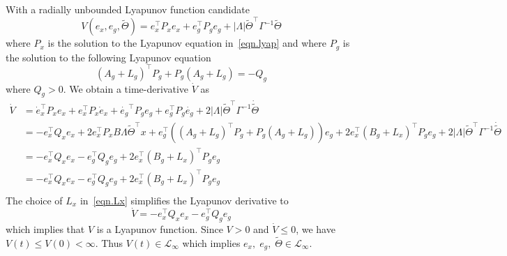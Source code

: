\documentclass[]{../sty/aiaa-tc}
\theoremstyle{examplestyle}
\begin{document}
  \begin{proof-dan}
    With a radially unbounded Lyapunov function candidate
    \begin{equation}
      \label{eqn.lyapfunction_2}
      V(e_{x},e_{g},\widetilde{\Theta}) = e_{x}^{\top}P_{x}e_{x}
      + e_{g}^{\top}P_{g}e_{g}
      + |\Lambda|\widetilde{\Theta}^{\top}\Gamma^{-1}\widetilde{\Theta}
    \end{equation}
    where $P_{x}$ is the solution to the Lyapunov equation in\ \eqref{eqn.lyap} and where $P_{g}$ is the solution to the following Lyapunov equation
    \begin{equation}
      \label{eqn.lyapg}
      (A_{g}+L_{g})^{\top}P_{g}+P_{g}(A_{g}+L_{g}) = -Q_{g}
    \end{equation}
    where $Q_{g}>0$.
    We obtain a time-derivative $\dot{V}$ as
    \begin{equation*}
      \begin{split}
        \dot{V}
        &= \dot{e}_{x}^{\top}P_{x}e_{x}
        + e_{x}^{\top}P_{x}\dot{e}_{x}
        + \dot{e_{g}}^{\top}P_{g}e_{g}
        + e_{g}^{\top}P_{g}\dot{e_{g}}
        + 2|\Lambda|\widetilde{\Theta}^{\top}\Gamma^{-1}\dot{\widetilde{\Theta}} \\
        &= -e_{x}^{\top}Q_{x}e_{x}
        + 2e_{x}^{\top}P_{x}B\Lambda\widetilde{\Theta}^{\top}x
        + e_{g}^{\top}((A_{g} + L_{g})^{\top}P_{g}
        + P_{g}(A_{g} + L_{g}))e_{g}
        + 2e_{x}^{\top}(B_{g}+L_{x})^{\top}P_{g}e_{g}
        + 2|\Lambda|\widetilde{\Theta}^{\top}\Gamma^{-1}\dot{\widetilde{\Theta}} \\
        &= -e_{x}^{\top}Q_{x}e_{x}
        - e_{g}^{\top}Q_{g}e_{g}
        + 2e_{x}^{\top}(B_{g}+L_{x})^{\top}P_{g}e_{g} \\
        &= -e_{x}^{\top}Q_{x}e_{x}
        - e_{g}^{\top}Q_{g}e_{g}
        + 2e_{x}^{\top}(B_{g}+L_{x})^{\top}P_{g}e_{g} \\
      \end{split}
    \end{equation*}
     The choice of $L_{x}$ in\ \eqref{eqn.Lx} simplifies the Lyapunov derivative to
    \begin{equation*}
      \dot{V} = -e_{x}^{\top}Q_{x}e_{x}
      - e_{g}^{\top}Q_{g}e_{g}
    \end{equation*}
    which implies that $V$ is a Lyapunov function.
    Since $V>0$ and $\dot{V}\leq0$, we have $V(t)\leq V(0)<\infty$.
    Thus $V(t)\in\mathcal{L}_{\infty}$ which implies $e_{x}, \; e_{g}, \; \widetilde{\Theta}\in\mathcal{L}_{\infty}$.

\end{proof-dan}
\end{document}
